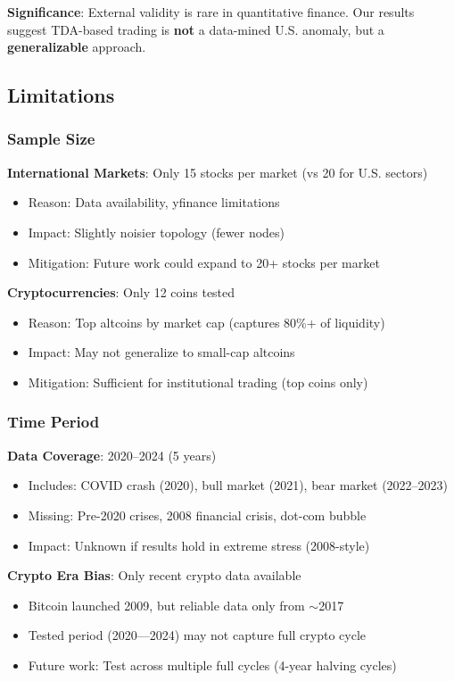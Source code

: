 \textbf{Significance}: External validity is rare in quantitative finance. Our results suggest TDA-based trading is \textbf{not} a data-mined U.S. anomaly, but a \textbf{generalizable} approach.

\subsection{Limitations}

\subsubsection{Sample Size}

\textbf{International Markets}: Only 15 stocks per market (vs 20 for U.S. sectors)
\begin{itemize}
\item Reason: Data availability, yfinance limitations
\item Impact: Slightly noisier topology (fewer nodes)
\item Mitigation: Future work could expand to 20+ stocks per market
\end{itemize}

\textbf{Cryptocurrencies}: Only 12 coins tested
\begin{itemize}
\item Reason: Top altcoins by market cap (captures 80\%+ of liquidity)
\item Impact: May not generalize to small-cap altcoins
\item Mitigation: Sufficient for institutional trading (top coins only)
\end{itemize}

\subsubsection{Time Period}

\textbf{Data Coverage}: 2020--2024 (5 years)
\begin{itemize}
\item Includes: COVID crash (2020), bull market (2021), bear market (2022--2023)
\item Missing: Pre-2020 crises, 2008 financial crisis, dot-com bubble
\item Impact: Unknown if results hold in extreme stress (2008-style)
\end{itemize}

\textbf{Crypto Era Bias}: Only recent crypto data available
\begin{itemize}
\item Bitcoin launched 2009, but reliable data only from $\sim$2017
\item Tested period (2020---2024) may not capture full crypto cycle
\item Future work: Test across multiple full cycles (4-year halving cycles)
\end{itemize}

